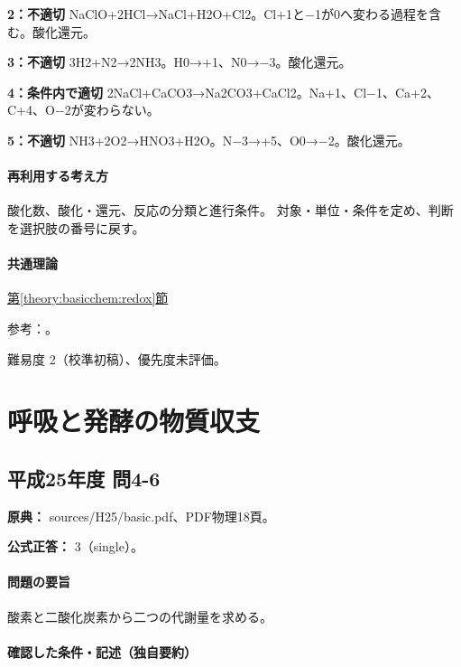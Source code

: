 \noindent\textbf{2：不適切} NaClO+2HCl→NaCl+H2O+Cl2。Cl+1と−1が0へ変わる過程を含む。酸化還元。\par

\noindent\textbf{3：不適切} 3H2+N2→2NH3。H0→+1、N0→−3。酸化還元。\par

\noindent\textbf{4：条件内で適切} 2NaCl+CaCO3→Na2CO3+CaCl2。Na+1、Cl−1、Ca+2、C+4、O−2が変わらない。\par

\noindent\textbf{5：不適切} NH3+2O2→HNO3+H2O。N−3→+5、O0→−2。酸化還元。\par

\paragraph{再利用する考え方} 酸化数、酸化・還元、反応の分類と進行条件。 対象・単位・条件を定め、判断を選択肢の番号に戻す。

\paragraph{共通理論} \hyperref[theory:basicchem:redox]{第\ref*{theory:basicchem:redox}節}

\par 参考：\cite{iupac_oxidation_state}。

\par 難易度 2（校準初稿）、優先度未評価。

\section{呼吸と発酵の物質収支}

\subsection{平成25年度 問4-6}
\label{q:h25-reg-basic-4-6}

\noindent\textbf{原典：} sources/H25/basic.pdf、PDF物理18頁。

\textbf{公式正答：} 3（single）。

\paragraph{問題の要旨} 酸素と二酸化炭素から二つの代謝量を求める。

\paragraph{確認した条件・記述（独自要約）}\mbox{}\par

